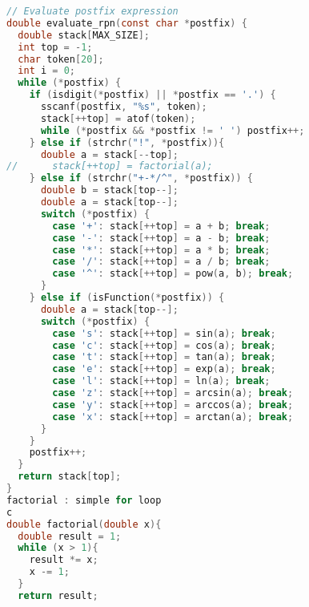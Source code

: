 \documentclass[conference]{IEEEtran}
\begin{document}
\begin{lstlisting}[language=C, caption={Simplified Parser Implementation}]
// Evaluate postfix expression
double evaluate_rpn(const char *postfix) {
  double stack[MAX_SIZE];
  int top = -1;
  char token[20];
  int i = 0;
  while (*postfix) {
    if (isdigit(*postfix) || *postfix == '.') {
      sscanf(postfix, "%s", token);
      stack[++top] = atof(token);
      while (*postfix && *postfix != ' ') postfix++;
    } else if (strchr("!", *postfix)){
      double a = stack[--top];
//      stack[++top] = factorial(a);
    } else if (strchr("+-*/^", *postfix)) {
      double b = stack[top--];
      double a = stack[top--];
      switch (*postfix) {
        case '+': stack[++top] = a + b; break;
        case '-': stack[++top] = a - b; break;
        case '*': stack[++top] = a * b; break;
        case '/': stack[++top] = a / b; break;
        case '^': stack[++top] = pow(a, b); break;
      }
    } else if (isFunction(*postfix)) {
      double a = stack[top--];
      switch (*postfix) {
        case 's': stack[++top] = sin(a); break;
        case 'c': stack[++top] = cos(a); break;
        case 't': stack[++top] = tan(a); break;
        case 'e': stack[++top] = exp(a); break;
        case 'l': stack[++top] = ln(a); break;
        case 'z': stack[++top] = arcsin(a); break;
        case 'y': stack[++top] = arccos(a); break;
        case 'x': stack[++top] = arctan(a); break;
      }
    }
    postfix++;
  }
  return stack[top];
}
factorial : simple for loop
c
double factorial(double x){
  double result = 1;
  while (x > 1){
    result *= x;
    x -= 1;
  }
  return result;
\end{lstlisting}
\end{document}
